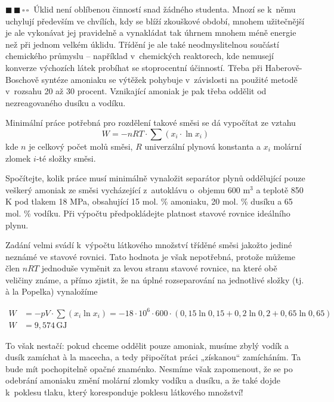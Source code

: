 \documentclass{book}
\newcommand{\dva}{$\blacksquare \, \blacksquare \, \square \, \square \; \; $}
\renewenvironment{quotation}{\par}{\par} %
\begin{document}
\hrulefill %
\begin{quotation}
\dva Úklid není oblíbenou činností snad žádného studenta. Mnozí se k~němu
uchylují především ve chvílích, kdy se blíží zkouškové období, mnohem
užitečnější je ale vykonávat jej pravidelně a vynakládat tak úhrnem
mnohem méně energie než při jednom velkém úklidu. Třídění je ale také
neodmyslitelnou součástí chemického průmyslu -- například v~chemických
reaktorech, kde nemusejí konverze výchozích látek probíhat se stoprocentní
účinností. Třeba při Haberově-Boschově syntéze amoniaku se výtěžek
pohybuje v~závislosti na použité metodě v~rozsahu 20 až 30 procent. Vznikající amoniak je pak třeba oddělit od nezreagovaného dusíku a vodíku.

Minimální práce potřebná pro rozdělení takové směsi se dá vypočítat
ze vztahu 
\[
W=-nRT\cdot\sum (x_{i}\cdot \ln x_{i})
\]
kde $n$
je celkový počet molů směsi, $R$ univerzální plynová konstanta a
$x_{i}$ molární zlomek $i$-té složky směsi. 

Spočítejte, kolik práce musí minimálně vynaložit separátor plynů oddělující
pouze veškerý amoniak ze směsi vycházející z~autoklávu o~objemu 600
m$^{3}$ a teplotě 850 K pod tlakem 18 MPa, obsahující 15 mol. \% amoniaku,
20 mol. \% dusíku a 65 mol. \% vodíku. Při výpočtu předpokládejte
platnost stavové rovnice ideálního plynu. 
\end{quotation} \dotfill \par 
Zadání velmi svádí k~výpočtu látkového množství tříděné směsi jakožto
jediné neznámé ve stavové rovnici. Tato hodnota je však nepotřebná,
protože můžeme člen $nRT$ jednoduše vyměnit za levou stranu stavové
rovnice, na které obě veličiny známe, a přímo zjistit, že na úplné
rozseparování na jednotlivé složky (tj. à la Popelka) vynaložíme

\begin{align*}
W & =-pV\cdot\sum(x_{i}\ln x_{i})=-18\cdot10^{6}\cdot600\cdot(0,15\ln0,15+0,2\ln0,2+0,65\ln0,65)\\
W & =9,574\,\mathrm{GJ}
\end{align*}

To však nestačí: pokud chceme oddělit pouze amoniak, musíme zbylý
vodík a dusík zamíchat à la macecha, a tedy připočítat práci „získanou“
zamícháním. Ta bude mít pochopitelně opačné znaménko. Nesmíme však zapomenout, že
se po odebrání amoniaku změní molární zlomky vodíku a dusíku, a že
také dojde k~poklesu tlaku, který koresponduje poklesu látkového množství!
\end{document}
